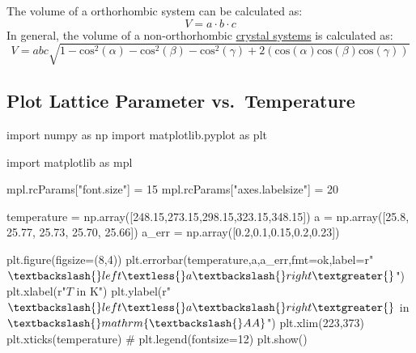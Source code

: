 \documentclass[
  letterpaper,
]{article}
\newenvironment{Shaded}{\begin{snugshade}}{\end{snugshade}}
\newcommand{\CommentTok}[1]{\textcolor[rgb]{0.37,0.37,0.37}{#1}}
\newcommand{\DecValTok}[1]{\textcolor[rgb]{0.68,0.00,0.00}{#1}}
\newcommand{\FloatTok}[1]{\textcolor[rgb]{0.68,0.00,0.00}{#1}}
\newcommand{\ImportTok}[1]{\textcolor[rgb]{0.00,0.46,0.62}{#1}}
\newcommand{\NormalTok}[1]{\textcolor[rgb]{0.00,0.23,0.31}{#1}}
\newcommand{\OperatorTok}[1]{\textcolor[rgb]{0.37,0.37,0.37}{#1}}
\newcommand{\StringTok}[1]{\textcolor[rgb]{0.13,0.47,0.30}{#1}}
\newcommand{\VerbatimStringTok}[1]{\textcolor[rgb]{0.13,0.47,0.30}{#1}}
\begin{document}
The volume of a orthorhombic system can be calculated as: \[
V = a\cdot b \cdot c
\] In general, the volume of a non-orthorhombic
\href{https://en.wikipedia.org/wiki/Crystal_system}{crystal systems} is
calculated as: \[
V = a b c \sqrt{1-\mathrm{cos}^2(\alpha) -\mathrm{cos}^2(\beta) - \mathrm{cos}^2(\gamma)+ 2(\mathrm{cos}(\alpha) \mathrm{cos}(\beta) \mathrm{cos}(\gamma))}
\]

\hypertarget{plot-lattice-parameter-vs.-temperature}{%
\subsection{Plot Lattice Parameter
vs.~Temperature}\label{plot-lattice-parameter-vs.-temperature}}

\begin{Shaded}
\begin{Highlighting}[]
\ImportTok{import}\NormalTok{ numpy }\ImportTok{as}\NormalTok{ np}
\ImportTok{import}\NormalTok{ matplotlib.pyplot }\ImportTok{as}\NormalTok{ plt}

\ImportTok{import}\NormalTok{ matplotlib }\ImportTok{as}\NormalTok{ mpl}

\NormalTok{mpl.rcParams[}\StringTok{"font.size"}\NormalTok{] }\OperatorTok{=} \DecValTok{15}
\NormalTok{mpl.rcParams[}\StringTok{"axes.labelsize"}\NormalTok{] }\OperatorTok{=} \DecValTok{20}

\NormalTok{temperature }\OperatorTok{=}\NormalTok{ np.array([}\FloatTok{248.15}\NormalTok{,}\FloatTok{273.15}\NormalTok{,}\FloatTok{298.15}\NormalTok{,}\FloatTok{323.15}\NormalTok{,}\FloatTok{348.15}\NormalTok{])}
\NormalTok{a }\OperatorTok{=}\NormalTok{ np.array([}\FloatTok{25.8}\NormalTok{, }\FloatTok{25.77}\NormalTok{, }\FloatTok{25.73}\NormalTok{, }\FloatTok{25.70}\NormalTok{, }\FloatTok{25.66}\NormalTok{])}
\NormalTok{a\_err }\OperatorTok{=}\NormalTok{ np.array([}\FloatTok{0.2}\NormalTok{,}\FloatTok{0.1}\NormalTok{,}\FloatTok{0.15}\NormalTok{,}\FloatTok{0.2}\NormalTok{,}\FloatTok{0.23}\NormalTok{])}

\NormalTok{plt.figure(figsize}\OperatorTok{=}\NormalTok{(}\DecValTok{8}\NormalTok{,}\DecValTok{4}\NormalTok{))}
\NormalTok{plt.errorbar(temperature,a,a\_err,fmt}\OperatorTok{=}\StringTok{\textquotesingle{}ok\textquotesingle{}}\NormalTok{,label}\OperatorTok{=}\VerbatimStringTok{r"$\textbackslash{}left \textless{} a \textbackslash{}right \textgreater{}$"}\NormalTok{)}
\NormalTok{plt.xlabel(}\VerbatimStringTok{r"$T$ in K"}\NormalTok{)}
\NormalTok{plt.ylabel(}\VerbatimStringTok{r"$\textbackslash{}left \textless{} a \textbackslash{}right \textgreater{} $ in $\textbackslash{}mathrm\{\textbackslash{}AA\}$"}\NormalTok{)}
\NormalTok{plt.xlim(}\DecValTok{223}\NormalTok{,}\DecValTok{373}\NormalTok{)}
\NormalTok{plt.xticks(temperature)}
\CommentTok{\# plt.legend(fontsize=12)}
\NormalTok{plt.show()}
\end{Highlighting}
\end{Shaded}
\end{document}
